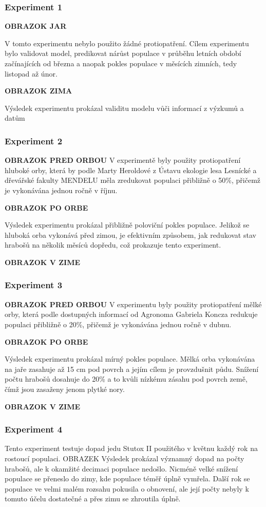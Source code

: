 \documentclass[a4paper,11pt]{article}
\begin{document}
\subsubsection{Experiment 1}
\textbf{OBRAZOK JAR}

V tomto experimentu nebylo použito žádné protiopatření. Cílem experimentu bylo validovat model, predikovat nárůst populace v průběhu letních období začínajících od března a naopak pokles populace v měsících zimních, tedy listopad až únor. 

\textbf{OBRAZOK ZIMA}

Výsledek experimentu prokázal validitu modelu vůči informací z výzkumů \cite{fluktuace} a datům \cite{Voles-popul-data:online}
\subsubsection{Experiment 2}
\textbf{OBRAZOK PRED ORBOU}
V experimentě byly použity protiopatření hluboké orby, která by podle Marty Heroldové z Ústavu ekologie lesa Lesnícké a dřevářské fakulty MENDELU měla zredukovat populaci přibližně o 50\%, přičemž je vykonávána jednou ročně v říjnu. 

\textbf{OBRAZOK PO ORBE}

Výsledek experimentu prokázal přibližně poloviční pokles populace. Jelikož se hluboká orba vykonává před zimou, je efektivním způsobem, jak redukovat stav hrabošů na několik měsíců dopředu, což prokazuje tento experiment.

\textbf{OBRAZOK V ZIME}

\subsubsection{Experiment 3}
\textbf{OBRAZOK PRED ORBOU}
V experimentu byly použity protiopatření mělké orby, která podle dostupných informací od Agronoma Gabriela Koncza redukuje populaci přibližně o 20\%, přičemž je vykonávána jednou ročně v dubnu. 

\textbf{OBRAZOK PO ORBE}

Výsledek experimentu prokázal mírný pokles populace. Mělká orba vykonávána na jaře zasahuje až 15 cm pod povrch a jejím cílem je provzdušnit půdu. Snížení počtu hrabošů dosahuje do 20\% a to kvůli nízkému zásahu pod povrch země, čímž jsou zasaženy jenom plytké nory. 


\textbf{OBRAZOK V ZIME}
\subsubsection{Experiment 4}
Tento experiment testuje dopad jedu Stutox II použitého v květnu každý rok na rostoucí populaci.
OBRAZEK
Výsledek prokázal významný dopad na počty hrabošů, ale k okamžité decimaci populace nedošlo. Nicméně velké snížení populace se přeneslo do zimy, kde populace téměř úplně vymřela. Další rok se populace ve velmi malém rozsahu pokusila o obnovení, ale její počty nebyly k tomuto účelu dostatečné a přes zimu se zhroutila úplně.
\end{document}
